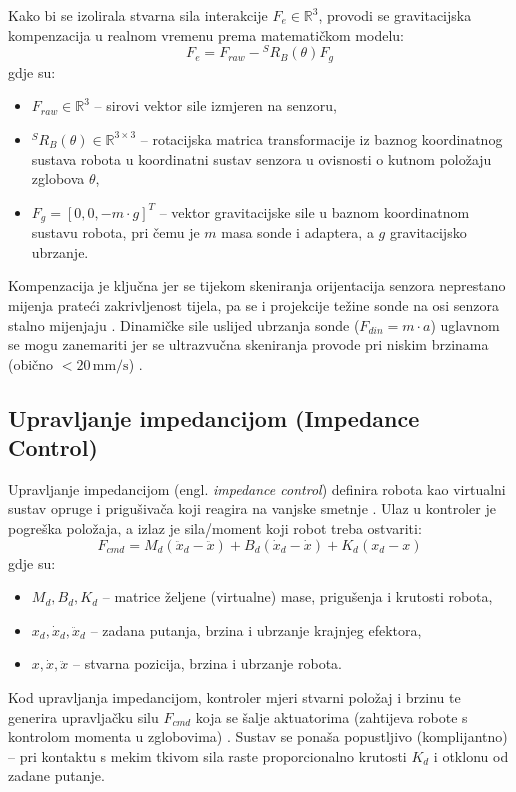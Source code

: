 Kako bi se izolirala stvarna sila interakcije $F_e \in \mathbb{R}^3$, provodi se gravitacijska kompenzacija u realnom vremenu prema matematičkom modelu:
\begin{equation}
    F_e = F_{raw} - {}^S R_B (\theta) F_g
\label{eq:gravity_compensation}
\end{equation}
gdje su:
\begin{itemize}
    \item $F_{raw} \in \mathbb{R}^3$ -- sirovi vektor sile izmjeren na senzoru,
    \item ${}^S R_B (\theta) \in \mathbb{R}^{3 \times 3}$ -- rotacijska matrica transformacije iz baznog koordinatnog sustava robota u koordinatni sustav senzora u ovisnosti o kutnom položaju zglobova $\theta$,
    \item $F_g = [0, 0, -m \cdot g]^T$ -- vektor gravitacijske sile u baznom koordinatnom sustavu robota, pri čemu je $m$ masa sonde i adaptera, a $g$ gravitacijsko ubrzanje.
\end{itemize}
Kompenzacija je ključna jer se tijekom skeniranja orijentacija senzora neprestano mijenja prateći zakrivljenost tijela, pa se i projekcije težine sonde na osi senzora stalno mijenjaju \cite{li2026robotic}. Dinamičke sile uslijed ubrzanja sonde ($F_{din} = m \cdot a$) uglavnom se mogu zanemariti jer se ultrazvučna skeniranja provode pri niskim brzinama (obično $< 20\,\text{mm/s}$) \cite{sae2026adaptive}.


\subsection{Upravljanje impedancijom (Impedance Control)}
Upravljanje impedancijom (engl. \textit{impedance control}) definira robota kao virtualni sustav opruge i prigušivača koji reagira na vanjske smetnje \cite{mathworks2025advanced, haddadin2024unified}. Ulaz u kontroler je pogreška položaja, a izlaz je sila/moment koji robot treba ostvariti:
\begin{equation}
    F_{cmd} = M_d (\ddot{x}_d - \ddot{x}) + B_d (\dot{x}_d - \dot{x}) + K_d (x_d - x)
\label{eq:impedance}
\end{equation}
gdje su:
\begin{itemize}
    \item $M_d, B_d, K_d$ -- matrice željene (virtualne) mase, prigušenja i krutosti robota,
    \item $x_d, \dot{x}_d, \ddot{x}_d$ -- zadana putanja, brzina i ubrzanje krajnjeg efektora,
    \item $x, \dot{x}, \ddot{x}$ -- stvarna pozicija, brzina i ubrzanje robota.
\end{itemize}
Kod upravljanja impedancijom, kontroler mjeri stvarni položaj i brzinu te generira upravljačku silu $F_{cmd}$ koja se šalje aktuatorima (zahtijeva robote s kontrolom momenta u zglobovima) \cite{ieee2023hybrid}. Sustav se ponaša popustljivo (komplijantno) -- pri kontaktu s mekim tkivom sila raste proporcionalno krutosti $K_d$ i otklonu od zadane putanje.


